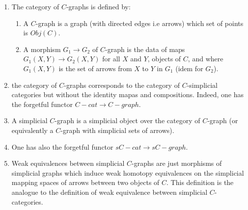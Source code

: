 \begin{refsection}
\begin{defin}
\begin{enumerate}
\item The category of $C$-graphs is defined by:
\begin{enumerate}
\item A $C$-graph is a graph (with directed edges i.e arrows) which set of points is $Obj(C)$.
\item A morphism $G_1 \rightarrow G_2$ of $C$-graph is the data of maps $G_1(X,Y) \rightarrow G_2(X,Y)$ for all $X$ and $Y$, objects of $C$, and where $G_1(X,Y)$ is the set of arrows from $X$ to $Y$ in $G_1$ (idem for $G_2$).
\end{enumerate}
\item the category of $C$-graphs corresponds to the category of $C$-simplicial categories but without the identity mapas and compositions. Indeed, one has the forgetful functor $C-cat \rightarrow C-graph$.
\item A simplicial $C$-graph is a simplicial object over the category of $C$-graph (or equivalently a $C$-graph with simplicial sets of arrows).
\item One has also the forgetful functor $sC-cat \rightarrow sC-graph$.
\item Weak equivalences between simplicial $C$-graphs are just morphisms of simplicial graphs which induce weak homotopy equivalences on the simplicial mapping spaces of arrows between two objects of $C$. This definition is the analogue to the definition of weak equivalence between simplicial $C$-categories.  
\end{enumerate}
\end{defin}


\end{refsection}
